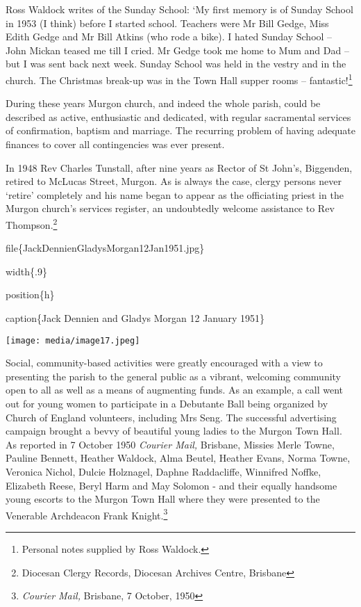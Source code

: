 Ross Waldock writes of the Sunday School: `My first memory is of Sunday
School in 1953 (I think) before I started school. Teachers were Mr Bill
Gedge, Miss Edith Gedge and Mr Bill Atkins (who rode a bike). I hated
Sunday School -- John Mickan teased me till I cried. Mr Gedge took me
home to Mum and Dad -- but I was sent back next week. Sunday School was
held in the vestry and in the church. The Christmas break-up was in the
Town Hall supper rooms -- fantastic!\footnote{Personal notes supplied by
  Ross Waldock.}

During these years Murgon church, and indeed the whole parish, could be
described as active, enthusiastic and dedicated, with regular
sacramental services of confirmation, baptism and marriage. The
recurring problem of having adequate finances to cover all contingencies
was ever present.

In 1948 Rev Charles Tunstall, after nine years as Rector of St John's,
Biggenden, retired to McLucas Street, Murgon. As is always the case,
clergy persons never `retire' completely and his name began to appear as
the officiating priest in the Murgon church's services register, an
undoubtedly welcome assistance to Rev Thompson.\footnote{Diocesan Clergy
  Records, Diocesan Archives Centre, Brisbane}

file\{JackDennienGladysMorgan12Jan1951.jpg\}

width\{.9\}

position\{h\}

caption\{Jack Dennien and Gladys Morgan 12 January 1951\}

\texttt{[image: media/image17.jpeg]}

Social, community-based activities were greatly encouraged with a view
to presenting the parish to the general public as a vibrant, welcoming
community open to all as well as a means of augmenting funds. As an
example, a call went out for young women to participate in a Debutante
Ball being organized by Church of England volunteers, including Mrs
Seng. The successful advertising campaign brought a bevvy of beautiful
young ladies to the Murgon Town Hall. As reported in 7 October 1950
\emph{Courier Mail,} Brisbane, Missies Merle Towne, Pauline Bennett,
Heather Waldock, Alma Beutel, Heather Evans, Norma Towne, Veronica
Nichol, Dulcie Holznagel, Daphne Raddacliffe, Winnifred Noffke,
Elizabeth Reese, Beryl Harm and May Solomon - and their equally handsome
young escorts to the Murgon Town Hall where they were presented to the
Venerable Archdeacon Frank Knight.\footnote{\emph{Courier Mail,}
  Brisbane, 7 October, 1950}

